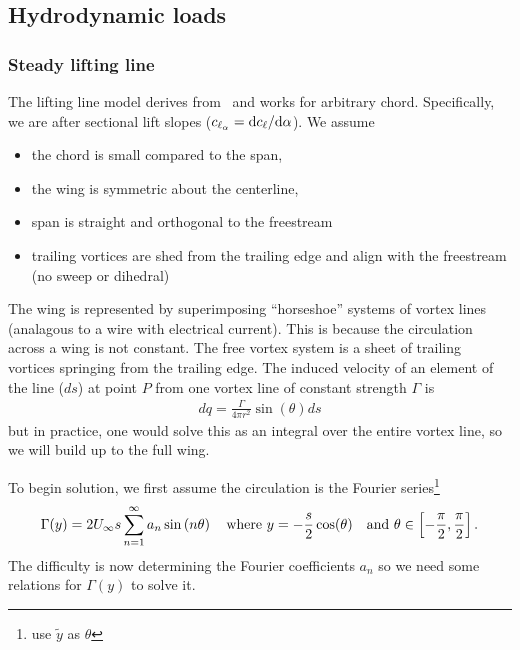 \documentclass[10pt]{article}
\newcommand{\be}{\begin{eqnarray}}
\newcommand{\ee}{\end{eqnarray}}
\newcommand{\Uinf}{U_{\infty}}
\newcommand{\tn}[1]{\textnormal{#1}}
\begin{document}
\subsection{Hydrodynamic loads}
% 
\subsubsection{Steady lifting line}
% 
The lifting line model derives from~\citet[Ch. XI]{Glauert1983a} and works for arbitrary chord.
Specifically, we are after sectional lift slopes ($\textstyle c_{\ell_\alpha} = \tn{d}c_\ell/\tn{d}\alpha$).
We assume
\begin{itemize}
    \item the chord is small compared to the span,
    \item the wing is symmetric about the centerline,
    \item span is straight and orthogonal to the freestream
    \item trailing vortices are shed from the trailing edge and align with the freestream (no sweep or dihedral)
\end{itemize}

The wing is represented by superimposing ``horseshoe'' systems of vortex lines (analagous to a wire with electrical current).
This is because the circulation across a wing is not constant.
The free vortex system is a sheet of trailing vortices springing from the trailing edge.
The induced velocity of an element of the line ($ds$) at point $P$ from one vortex line of constant strength $\Gamma$ is
\be
dq = \frac{\Gamma}{4 \pi r^2} \sin(\theta) ds
\ee
but in practice, one would solve this as an integral over the entire vortex line, so we will build up to the full wing.

To begin solution, we first assume the circulation is the Fourier series\footnote{\citet{Kerwin2010} use $\tilde{y}$ as $\theta$}
\be
\Gamma(y) = 2 \Uinf s \sum_{n=1}^{\infty} a_n \sin \left( n \theta \right)
\quad \tn{where }
y = -\frac{s}{2}\cos(\theta)
\quad \tn{and }
\theta \in \left[-\frac{\pi}{2},\frac{\pi}{2}\right]
.
\ee
The difficulty is now determining the Fourier coefficients $a_n$ so we need some relations for $\Gamma(y)$ to solve it.
\end{document}
